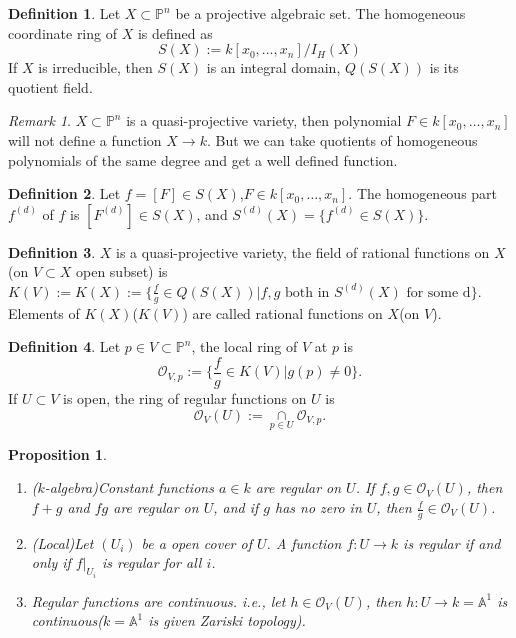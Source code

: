 \documentclass{amsart}
\theoremstyle{plain}
\newtheorem{proposition}{Proposition}
\theoremstyle{definition}
\newtheorem{definition}{Definition}
\theoremstyle{remark}
\newtheorem*{remark}{Remark}
\numberwithin{equation}{section}
\begin{document}
\begin{definition}
	Let $ X\subset\mathbb{P}^n $ be a projective algebraic set. The homogeneous coordinate ring of $ X $ is defined as
	\begin{equation}
	S(X):=k[x_0,\dots,x_n]/I_H(X)
	\end{equation}
	If $ X $ is irreducible, then $ S(X) $ is an integral domain, $ Q(S(X)) $ is its quotient field.
\end{definition}
\begin{remark}
	$ X\subset \mathbb{P}^n$ is a quasi-projective variety, then polynomial $ F\in k[x_0,\dots,x_n] $ will not define a function $ X\to k $. But we can take quotients of homogeneous polynomials of the same degree and get a well defined function.
\end{remark}
\begin{definition}
	Let $ f= [F]\in S(X) $,$ F\in k[x_0,\dots,x_n] $. The homogeneous part $ f^{(d)} $ of $ f $ is $ [F^{(d)}]\in S(X) $, and
	$ S^{(d)}(X) = \{ f^{(d)}\in S(X) \} $. 
\end{definition}
\begin{definition}
	$ X $ is a quasi-projective variety, the field of rational functions on $ X $(on $ V \subset X$ open subset) is 
	$ K(V):=K(X):=\{ \frac{f}{g}\in Q(S(X))|f,g \text{ both in } S^{(d)}(X) \text{ for some d} \} $.
	Elements of $ K(X) $($ K(V) $) are called rational functions on $ X $(on $ V $).
\end{definition}
\begin{definition}
	Let $ p\in V\subset\mathbb{P}^n $, the local ring of $ V $ at $ p $ is 
	\begin{equation}
	\mathcal{O}_{V,p}:=\{ \frac{f}{g}\in K(V)|g(p)\neq 0 \}.
	\end{equation}
	If $ U\subset V $ is open, the ring of regular functions on $ U $ is 
	\begin{equation}
	\mathcal{O}_V(U):=\mathop{\cap}\limits_{p\in U}\mathcal{O}_{V,p}.
	\end{equation}
\end{definition}
\begin{proposition}\label{8}
	\begin{enumerate}
		\item ($ k $-algebra)Constant functions $ a\in k $ are regular on $ U $. If $ f,g\in \mathcal{O}_V(U) $, then $ f+g $ and $ fg $ are regular on $ U $, and if $ g $ has no zero in $ U $, then $ \frac{f}{g} \in \mathcal{O}_{V}(U)$.
		\item (Local)Let $ (U_i) $ be a open cover of $ U $. A function $ f:U\to k $ is regular if and only if $ f|_{U_i} $ is regular for all $ i $.
		\item Regular functions are continuous. i.e., let $ h\in \mathcal{O}_V(U) $, then $ h:U\to k=\mathbb{A}^1 $ is continuous($ k=\mathbb{A}^1 $ is given Zariski topology).  
	\end{enumerate}
\end{proposition}
\end{document}

